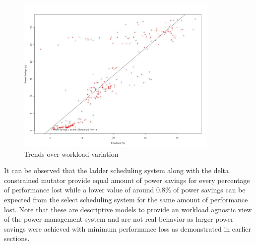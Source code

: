 \begin{figure}[h!]
  \begin{center}
    \includegraphics[height=3.0in]{figures/slowdown_power_select.jpg}%
    \caption{Trends over workload variation}
    \label{fig:slowdown_power_select}
  \end{center}
\end{figure}

It can be observed that the ladder scheduling system along with the delta constrained mutator 
provide equal amount of power savings for every percentage of performance lost while a lower 
value of around 0.8\% of power savings can be expected from the select scheduling system for
the same amount of performance lost. Note that these are descriptive models to provide an
workload agnostic view of the power management system and are not real behavior as larger
power savings were achieved with minimum performance loss as demonstrated in earlier sections. 